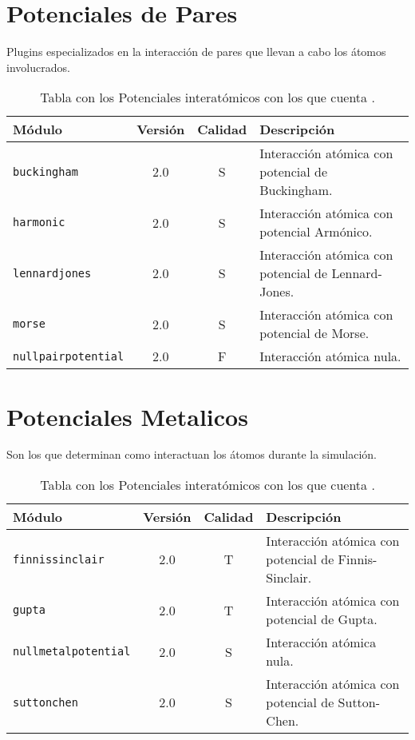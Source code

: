 \section{Potenciales de Pares}
Plugins especializados en la interacci\'on de pares que llevan a cabo los \'atomos involucrados.

\begin{table}[h!]
 \begin{tabular}{|l|c|c|p{10cm}|}\hline
 M\'odulo & Versi\'on & Calidad & Descripci\'on \\
 \hline\hline
 \texttt{buckingham} & 2.0 & S & Interacci\'on at\'omica con potencial de Buckingham.\\
 \hline
 \texttt{harmonic} & 2.0 & S & Interacci\'on at\'omica con potencial Arm\'onico.\\
 \hline
 \texttt{lennardjones} & 2.0 & S & Interacci\'on at\'omica con potencial de Lennard-Jones.\\
 \hline
 \texttt{morse} & 2.0 & S & Interacci\'on at\'omica con potencial de Morse.\\
 \hline
 \texttt{nullpairpotential} & 2.0 & F & Interacci\'on at\'omica nula.\\
 \hline
 \end{tabular}
\label{tab:modpotentials}
\caption{Tabla con los Potenciales interat\'omicos con los que cuenta {\lpmd}.}
\end{table}

\section{Potenciales Metalicos}
Son los que determinan como interactuan los \'atomos durante la simulaci\'on.

\begin{table}[h!]
 \begin{tabular}{|l|c|c|p{10cm}|}\hline
 M\'odulo & Versi\'on & Calidad & Descripci\'on \\
 \hline\hline
 \texttt{finnissinclair} & 2.0 & T & Interacci\'on at\'omica con potencial de Finnis-Sinclair.\\
 \hline
 \texttt{gupta} & 2.0 & T & Interacci\'on at\'omica con potencial de Gupta.\\
 \hline
 \texttt{nullmetalpotential} & 2.0 & S & Interacci\'on at\'omica nula.\\
 \hline
 \texttt{suttonchen} & 2.0 & S & Interacci\'on at\'omica con potencial de Sutton-Chen.\\
 \hline
 \end{tabular}
\label{tab:modpotentials}
\caption{Tabla con los Potenciales interat\'omicos con los que cuenta {\lpmd}.}
\end{table}


